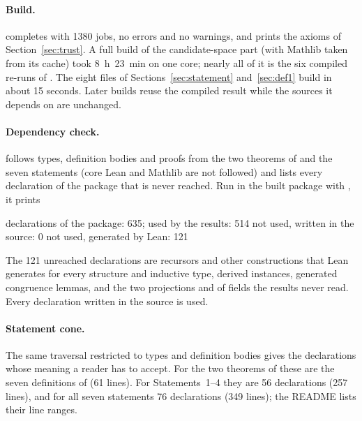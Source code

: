 \paragraph{Build.}  completes with 1380 jobs, no errors and
no warnings, and prints the axioms of Section~\ref{sec:trust}. A full build
of the candidate-space part (with Mathlib taken from its cache) took
8~h~23~min on one core; nearly all of it is the six compiled re-runs of
. The eight files of Sections~\ref{sec:statement}
and~\ref{sec:def1} build in about 15 seconds. Later builds reuse the compiled
result while the sources it depends on are unchanged.

\paragraph{Dependency check.}  follows types,
definition bodies and proofs from the two theorems of 
and the seven statements (core Lean and Mathlib are not followed) and lists
every declaration of the package that is never reached. Run in the built
package with , it prints
\begin{code}
declarations of the package: 635; used by the results: 514
not used, written in the source: 0
not used, generated by Lean: 121
\end{code}
The 121 unreached declarations are recursors and other constructions that
Lean generates for every structure and inductive type, derived instances,
generated congruence lemmas, and the two projections  and
 of fields the results never read. Every declaration
written in the source is used.

\paragraph{Statement cone.} The same traversal restricted to types and
definition bodies gives the declarations whose meaning a reader has to
accept. For the two theorems of  these are the seven
definitions of  (61 lines). For Statements~1--4 they
are 56 declarations (257 lines), and for all seven statements 76
declarations (349 lines); the README lists their line ranges.
